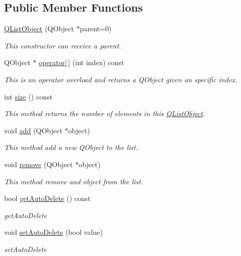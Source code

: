 \subsection*{Public Member Functions}
\begin{DoxyCompactItemize}
\item 
\hyperlink{class_q_list_object_a035ee9dc9f035443995b9419d32b07da}{Q\+List\+Object} (Q\+Object $\ast$parent=0)
\begin{DoxyCompactList}\small\item\em This constructor can receive a parent. \end{DoxyCompactList}\item 
Q\+Object $\ast$ \hyperlink{class_q_list_object_a9b87308d291c9699a36849e5d8bfedd4}{operator\mbox{[}$\,$\mbox{]}} (int index) const
\begin{DoxyCompactList}\small\item\em This is an operator overload and returns a Q\+Object given an specific index. \end{DoxyCompactList}\item 
int \hyperlink{class_q_list_object_a4ded55097ea08fa5781240883a591216}{size} () const
\begin{DoxyCompactList}\small\item\em This method returns the number of elements in this \hyperlink{class_q_list_object}{Q\+List\+Object}. \end{DoxyCompactList}\item 
void \hyperlink{class_q_list_object_ad5e960eabd3e9b7d49228ea7549a9bd7}{add} (Q\+Object $\ast$object)
\begin{DoxyCompactList}\small\item\em This method add a new Q\+Object to the list. \end{DoxyCompactList}\item 
void \hyperlink{class_q_list_object_af6bc1883142f976bfd3e82c9d0c030bb}{remove} (Q\+Object $\ast$object)
\begin{DoxyCompactList}\small\item\em This method remove and object from the list. \end{DoxyCompactList}\item 
bool \hyperlink{class_q_list_object_ad9d1f7e3c9f2563bcded31b02edc06fb}{get\+Auto\+Delete} () const
\begin{DoxyCompactList}\small\item\em get\+Auto\+Delete \end{DoxyCompactList}\item 
void \hyperlink{class_q_list_object_a6c30632fb46f8f7d404f77a9fea49bee}{set\+Auto\+Delete} (bool value)
\begin{DoxyCompactList}\small\item\em set\+Auto\+Delete \end{DoxyCompactList}\end{DoxyCompactItemize}


